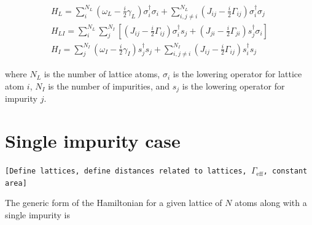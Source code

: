 \documentclass[aps,pra,superscriptaddress,twocolumn]{revtex4-1}
\newcommand{\commentSB}[1]{\texttt{\color{blue}[#1]}}
\newcommand{\commentSO}[1]{\texttt{\color{orange}[#1]}}
\newcommand{\commentTP}[1]{\texttt{\color{green}[#1]}}
\begin{document}
\begin{subequations}
    \begin{align}   
        H_L = \sum_i^{N_L} \left( \omega_L - \frac{i}{2} \gamma_L \right) \sigma_i^\dag \sigma_i + \sum_{i,j \neq i}^{N_L} \left( J_{ij} - \frac{i}{2} \Gamma_{ij} \right) \sigma_i^\dag \sigma_j \\
        H_{LI} = \sum_{i}^{N_L}  \sum_{j}^{N_I} \left[ \left( J_{ij} - \frac{i}{2} \Gamma_{ij} \right) \sigma_i^\dag s_j + \left( J_{ji} - \frac{i}{2} \Gamma_{ji} \right) s_j^\dag \sigma_i \right] \\
        H_I = \sum_j^{N_I} \left( \omega_I - \frac{i}{2} \gamma_I \right) s_j^\dag s_j + \sum_{i,j \neq i}^{N_I} \left( J_{ij} - \frac{i}{2} \Gamma_{ij} \right) s_i^\dag s_j
        \label{eqn:Hamiltonian}
    \end{align}
\end{subequations}

where $N_L$ is the number of lattice atoms, $\sigma_i$ is the lowering operator for lattice atom $i$, $N_I$ is the number of impurities, and $s_j$ is the lowering operator for impurity $j$. 



\section{Single impurity case}
\commentSO{Define lattices, define distances related to lattices, $\Gamma_\mathrm{eff}$, constant area}



The generic form of the Hamiltonian for a given lattice of $N$ atoms along with a single impurity is 
\end{document}
